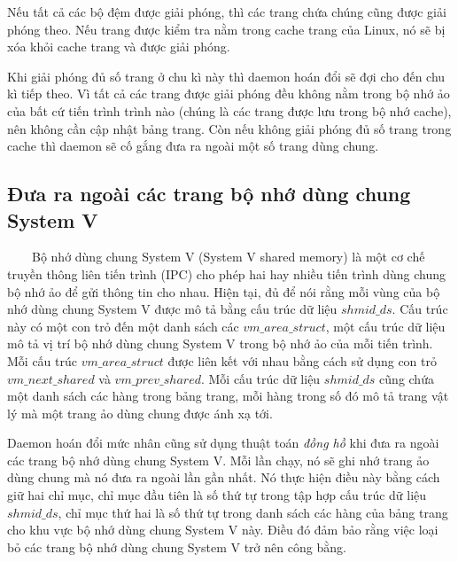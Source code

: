 \documentclass{article}
\begin{document}
Nếu tất cả các bộ đệm được giải phóng, thì các trang chứa chúng cũng được giải phóng theo. Nếu trang được kiểm tra nằm trong cache trang của Linux, nó sẽ bị xóa khỏi cache trang và được giải phóng.\vspace{1em}

Khi giải phóng đủ số trang ở chu kì này thì daemon hoán đổi sẽ đợi cho đến chu kì tiếp theo. Vì tất cả các trang được giải phóng đều không nằm trong bộ nhớ ảo của bất cứ tiến trình trình nào (chúng là các trang được lưu trong bộ nhớ cache), nên không cần cập nhật bảng trang. Còn nếu không giải phóng đủ số trang trong cache thì daemon sẽ cố gắng đưa ra ngoài một số trang dùng chung.

\subsection{Đưa ra ngoài các trang bộ nhớ dùng chung System V}

~~~~Bộ nhớ dùng chung System V (System V shared memory) là một cơ chế truyền thông liên tiến trình (IPC) cho phép hai hay nhiều tiến trình dùng chung bộ nhớ ảo để gửi thông tin cho nhau. Hiện tại, đủ để nói rằng mỗi vùng của bộ nhớ dùng chung System V được mô tả bằng cấu trúc dữ liệu $shmid\_ds$. Cấu trúc này có một con trỏ đến một danh sách các $vm\_area\_struct$, một cấu trúc dữ liệu mô tả vị trí bộ nhớ dùng chung System V trong bộ nhớ ảo của mỗi tiến trình. Mỗi cấu trúc $vm\_area\_struct$ được liên kết với nhau bằng cách sử dụng con trỏ $vm\_next\_shared$ và $vm\_prev\_shared$. Mỗi cấu trúc dữ liệu $shmid\_ds$ cũng chứa một danh sách các hàng trong bảng trang, mỗi hàng trong số đó mô tả trang vật lý mà một trang ảo dùng chung được ánh xạ tới.\vspace{1em}

Daemon hoán đổi mức nhân cũng sử dụng thuật toán \textit{đồng hồ} khi đưa ra ngoài các trang bộ nhớ dùng chung System V. Mỗi lần chạy, nó sẽ ghi nhớ trang ảo dùng chung mà nó đưa ra ngoài lần gần nhất. Nó thực hiện điều này bằng cách giữ hai chỉ mục, chỉ mục đầu tiên là số thứ tự trong tập hợp cấu trúc dữ liệu $shmid\_ds$, chỉ mục thứ hai là số thứ tự trong danh sách các hàng của bảng trang cho khu vực bộ nhớ dùng chung System V này. Điều đó đảm bảo rằng việc loại bỏ các trang bộ nhớ dùng chung System V trở nên công bằng.\vspace{1em}
\end{document}
